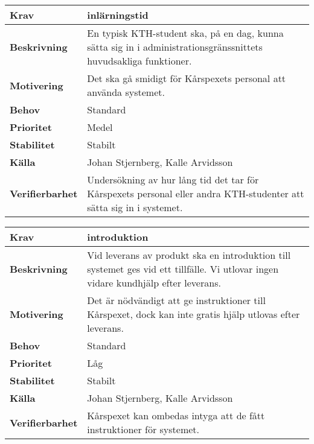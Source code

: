 \documentclass[a4paper, twoside, 11pt, titlepage]{article}
\begin{document}
		\begin{tabular} { | p{3cm} | p{12.2cm} | }
			\hline
			\textbf{Krav} & inlärningstid  \\
			\hline
			\textbf{Beskrivning} & En typisk KTH-student ska, på en dag, kunna sätta sig in i administrationsgränssnittets huvudsakliga funktioner.  \\
			\hline
			\textbf{Motivering} & Det ska gå smidigt för Kårspexets personal att använda systemet.  \\
			\hline
			\textbf{Behov} & Standard  \\
			\hline
			\textbf{Prioritet} & Medel  \\
			\hline
			\textbf{Stabilitet} & Stabilt  \\
			\hline
			\textbf{Källa} & Johan Stjernberg, Kalle Arvidsson  \\
			\hline
			\textbf{Verifierbarhet} & Undersökning av hur lång tid det tar för Kårspexets personal eller andra KTH-studenter att sätta sig in i systemet.  \\
			\hline
		\end{tabular}

		\begin{tabular} { | p{3cm} | p{12.2cm} | }
			\hline
			\textbf{Krav} & introduktion  \\
			\hline
			\textbf{Beskrivning} & Vid leverans av produkt ska en introduktion till systemet ges vid ett tillfälle. Vi utlovar ingen vidare kundhjälp efter leverans.  \\
			\hline
			\textbf{Motivering} & Det är nödvändigt att ge instruktioner till Kårspexet, dock kan inte gratis hjälp utlovas efter leverans.  \\
			\hline
			\textbf{Behov} & Standard  \\
			\hline
			\textbf{Prioritet} & Låg  \\
			\hline
			\textbf{Stabilitet} & Stabilt  \\
			\hline
			\textbf{Källa} & Johan Stjernberg, Kalle Arvidsson  \\
			\hline
			\textbf{Verifierbarhet} & Kårspexet kan ombedas intyga att de fått instruktioner för systemet.  \\
			\hline
		\end{tabular}
\end{document}
